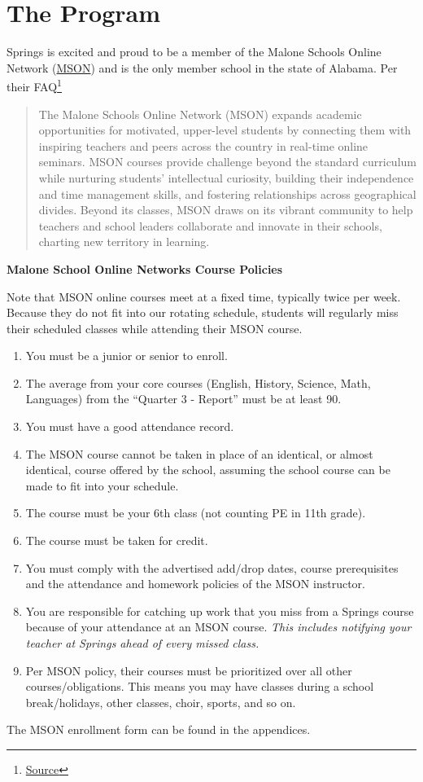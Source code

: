 \section{The Program}
Springs is  excited and proud to be a member of the Malone Schools Online Network (\href{https://maloneschoolsonline.org/}{MSON}) and is the only member school in the state of Alabama.  Per their FAQ\footnote{\href{https://maloneschoolsonline.org/faq/}{Source}}

\begin{quote}
  The Malone Schools Online Network (MSON) expands academic opportunities for motivated, upper-level students by connecting them with inspiring teachers and peers across the country in real-time online seminars. MSON courses provide challenge beyond the standard curriculum while nurturing students’ intellectual curiosity, building their independence and time management skills, and fostering relationships across geographical divides. Beyond its classes, MSON draws on its vibrant community to help teachers and school leaders collaborate and innovate in their schools, charting new territory in learning.
\end{quote}

\noindent \textbf{Malone School Online Networks Course Policies}


Note that MSON online courses meet at a fixed time, typically twice per week.  Because they do not fit into our rotating schedule, students will regularly miss their scheduled classes while attending their MSON course. 

\begin{enumerate}\itemsep=0mm
\item You must be a junior or senior to enroll.
\item The average from your core courses (English, History, Science, Math, Languages) from the “Quarter 3 - Report” must be at least 90.
\item You must have a good attendance record. 
\item The MSON course cannot be taken in place of an identical, or almost identical, course offered by the school, assuming the school course can be made to fit into your schedule. 
\item The course must be your 6th class (not counting PE in 11th grade). 
\item The course must be taken for credit. 
\item You must comply with the advertised add/drop dates, course prerequisites and the attendance and homework policies of the MSON instructor. 
\item You are responsible for catching up work that you miss from a Springs course because of your attendance at an MSON course.  \emph{This includes notifying your teacher at Springs ahead of every missed class.}  
\item Per MSON policy, their courses must be prioritized over all other courses/obligations.  This means you may have classes during a school break/holidays, other classes, choir, sports, and so on.  
\end{enumerate}

The MSON enrollment form can be found in the appendices.

